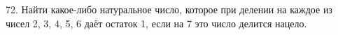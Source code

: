 72. Найти какое-либо натуральное число, которое при делении на каждое из чисел 2, 3, 4, 5, 6 даёт остаток 1, если на 7 это число делится нацело.\\
